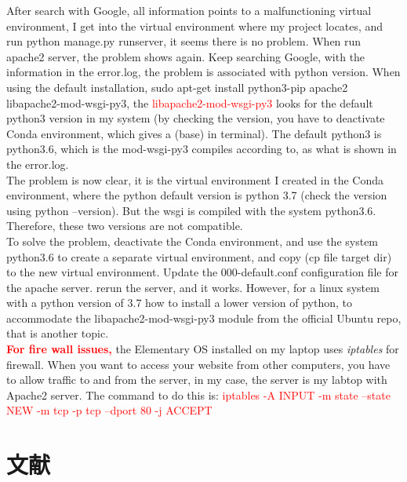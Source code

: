 \documentclass[UTF8,fancyhdr,a4paper]{ctexart}
\newcommand{\pflred}[1]{\textcolor{red}{#1}}
\begin{document}
After search with Google, all information points to a malfunctioning virtual environment, I get into the virtual environment where my project locates, and run python manage.py runserver, it seems there is no problem. When run apache2 server, the problem shows again. Keep searching Google, with the information in the error.log, the problem is associated with python version. When using the default installation, sudo apt-get install python3-pip apache2 libapache2-mod-wsgi-py3, the \pflred{libapache2-mod-wsgi-py3} looks for the default python3 version in my system (by checking the version, you have to deactivate Conda environment, which gives a (base) in terminal). The default python3 is python3.6, which is the mod-wsgi-py3 compiles according to, as what is shown in the error.log.\\

The problem is now clear, it is the virtual environment I created in the Conda environment, where the python default version is python 3.7 (check the version using python --version). But the wsgi is compiled with the system python3.6. Therefore, these two versions are not compatible. \\

To solve the problem, deactivate the Conda environment, and use the system python3.6 to create a separate virtual environment, and copy (cp file target dir) to the new virtual environment. Update the 000-default.conf configuration file for the apache server. rerun the server, and it works. However, for a linux system with a python version of 3.7 how to install a lower version of python, to accommodate the libapache2-mod-wsgi-py3 module from the official Ubuntu repo, that is another topic.\\

\textbf{\pflred{For fire wall issues,}} the Elementary OS installed on my laptop uses \emph{ iptables } for firewall. When you want to access your website from other computers, you have to allow traffic to and from the server, in my case, the server is my labtop with Apache2 server. The command to do this is: \pflred{iptables -A INPUT -m state --state NEW -m tcp -p tcp --dport 80 -j ACCEPT}

\newpage
\section{文献}
\cite{10cm}


\end{document}
